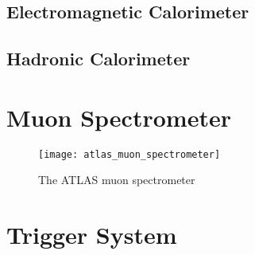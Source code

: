 \subsection{Electromagnetic Calorimeter}

\subsection{Hadronic Calorimeter}

\section{Muon Spectrometer}


\begin{figure}
\caption{The ATLAS muon spectrometer} \label{fig:atlas_muon_spectrometer}
\texttt{[image: atlas\_muon\_spectrometer]}
\end{figure}


\section{Trigger System}